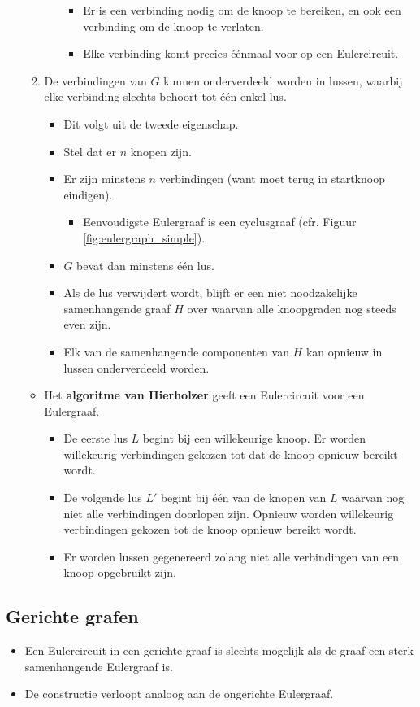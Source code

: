 \begin{itemize}
\begin{enumerate}
\begin{itemize}
\begin{itemize}
				\item Er is een verbinding nodig om de knoop te bereiken, en ook een verbinding om de knoop te verlaten.
				\item Elke verbinding komt precies éénmaal voor op een Eulercircuit.
			\end{itemize}
		\end{itemize}
		\item De verbindingen van $G$ kunnen onderverdeeld worden in lussen, waarbij elke verbinding slechts behoort tot één enkel lus.
		\begin{itemize}
			\item Dit volgt uit de tweede eigenschap.
			\item Stel dat er $n$ knopen zijn.
			\item Er zijn minstens $n$ verbindingen (want moet terug in startknoop eindigen).
			\begin{itemize}
				\item Eenvoudigste Eulergraaf is een cyclusgraaf (cfr. Figuur \ref{fig:eulergraph_simple}).
			\end{itemize}
			\item $G$ bevat dan minstens één lus.
			\item Als de lus verwijdert wordt, blijft er een niet noodzakelijke samenhangende graaf $H$ over waarvan alle knoopgraden nog steeds even zijn.
			\item Elk van de samenhangende componenten van $H$ kan opnieuw in lussen onderverdeeld worden.
		\end{itemize}
	\end{enumerate}
	\begin{itemize}
		\item Het \textbf{algoritme van Hierholzer} geeft een Eulercircuit voor een Eulergraaf.
		\begin{itemize}
			\item De eerste lus $L$ begint bij een willekeurige knoop. Er worden willekeurig verbindingen gekozen tot dat de knoop opnieuw bereikt wordt.
			\item De volgende lus $L'$ begint bij één van de knopen van $L$ waarvan nog niet alle verbindingen doorlopen zijn. Opnieuw worden willekeurig verbindingen gekozen tot de knoop opnieuw bereikt wordt.
			\item Er worden lussen gegenereerd zolang niet alle verbindingen van een knoop opgebruikt zijn.
		\end{itemize}
	\end{itemize}
\end{itemize}



\subsection{Gerichte grafen}
\begin{itemize}
	\item Een Eulercircuit in een gerichte graaf is slechts mogelijk als de graaf een sterk samenhangende Eulergraaf is.
	\item De constructie verloopt analoog aan de ongerichte Eulergraaf.
\end{itemize}